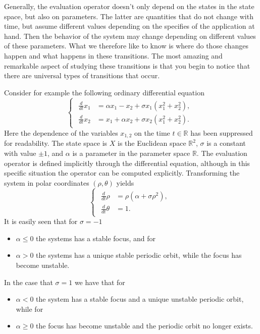 Generally, the evaluation operator doesn't only depend on the states in the
state space, but also on parameters. The latter are quantities that do not
change with time, but assume different values depending on the specifies of the
application at hand. Then the behavior of the system may change depending on
different values of these parameters. What we therefore like to know is where
do those changes happen and what happens in these transitions. The most amazing
and remarkable aspect of studying these transitions is that you begin to notice
that there are universal types of transitions that occur.

Consider for example the following ordinary differential equation
\[
    \begin{cases}
    \begin{aligned}
        \frac{d}{dt} x_1 &= \alpha x_1  - x_2 + \sigma x_1(x_1^2 + x_2^2), \\
        \frac{d}{dt} x_2 &= x_1 + \alpha  x_2 + \sigma x_2(x_1^2 + x_2^2).
    \end{aligned}
    \end{cases}
\]
Here the dependence of the variables $x_{1,2}$ on the time $t\in \mathbb R$ has
been suppressed for readability. The state space is $X$ is the Euclidean space
$\mathbb R^2$, $\sigma$ is a constant with value $\pm 1$, and $\alpha$ is a
parameter in the parameter space $\mathbb R$. The evaluation operator is defined
implicitly through the differential equation, although in this specific situation
the operator can be computed explicitly. Transforming the system in polar
coordinates $(\rho, \theta)$ yields
\[
    \begin{cases}
    \begin{aligned}
        \frac{d}{dt} \rho &= \rho(\alpha + \sigma \rho^2), \\
        \frac{d}{dt} \theta &= 1.
    \end{aligned}
    \end{cases}
\]
It is easily seen that for $\sigma=-1$
\begin{itemize}
    \item $\alpha \leq 0$ the systems has a stable focus, and for 
    \item $\alpha > 0$ the systems has a unique stable periodic orbit,
        while the focus has become unstable.
\end{itemize}
In the case that $\sigma=1$ we have that for
\begin{itemize}
    \item $\alpha < 0$ the system has a stable focus and a unique unstable
        periodic orbit, while for
    \item $\alpha \geq 0$ the focus has become
        unstable and the periodic orbit no longer exists.
\end{itemize}
